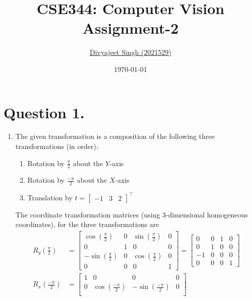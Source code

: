 \documentclass[10pt]{article}
\title{
    \textbf{CSE344: Computer Vision} \\ \vspace*{-5pt}
    \textbf{\large{Assignment-2}}
}
\author{\href{mailto:divyajeet21529@iiitd.ac.in}{Divyajeet Singh (2021529)}}
\date{\today}
\begin{document}
    \maketitle

    \section*{\textbf{Question 1.}}
    \begin{enumerate}
        \item The given transformation is a composition of the following three transformations
        (in order):
        \begin{enumerate}[label=(\alph*)]
            \item Rotation by $\frac{\pi}{2}$ about the $Y$-axis
            \item Rotation by $\frac{-\pi}{2}$ about the $X$-axis
            \item Translation by $t = \begin{bmatrix} -1 & 3 & 2 \end{bmatrix}^{\top}$
        \end{enumerate}
        The coordinate transformation matrices (using 3-dimensional homogeneous coordinates),
        for the three transformations are
        \begin{align*}
            R_{y}\left(\frac{\pi}{2}\right) &= \begin{bmatrix}
                \cos{\left(\frac{\pi}{2}\right)} & 0 & \sin{\left(\frac{\pi}{2}\right)} & 0 \\
                0 & 1 & 0 & 0 \\
                -\sin{\left(\frac{\pi}{2}\right)} & 0 & \cos{\left(\frac{\pi}{2}\right)} & 0 \\
                0 & 0 & 0 & 1
            \end{bmatrix} = \begin{bmatrix}
                0 & 0 & 1 & 0 \\
                0 & 1 & 0 & 0 \\
                -1 & 0 & 0 & 0 \\
                0 & 0 & 0 & 1
            \end{bmatrix} \\
            R_{x}\left(\frac{-\pi}{2}\right) &= \begin{bmatrix}
                1 & 0 & 0 & 0 \\
                0 & \cos{\left(\frac{-\pi}{2}\right)} & -\sin{\left(\frac{-\pi}{2}\right)} & 0 \\

\end{bmatrix}
\end{align*}
\end{enumerate}
\end{document}
